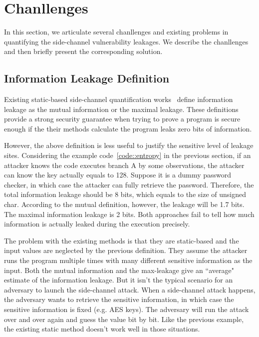 \section{Chanllenges}

In this section, we articulate several chanllenges and existing problems
in quantifying the side-channel vulnerability leakages. We describe the
chanllenges and then briefly present the corresponding solution.

\subsection{Information Leakage Definition}
Existing static-based side-channel quantification works~\cite{182946} define information leakage
as the mutual information or the maximal leakage. These definitions provide a strong security guarantee
when trying to prove a program is secure enough if the their methods calculate the program 
leaks zero bits of information.

However, the above definition is less useful to justify the sensitive level of leakage sites. 
Considering the example code~\ref{code::entropy} in the previous section, if an attacker knows the
code executes branch A by some observations, the attacker can know the key actually equals to 128. 
Suppose it is a dummy password checker, in which case the attacker can fully retrieve the password.
Therefore, the total information leakage should be 8 bits, which equals to the size
of unsigned char. 
According to the mutual definition, however, the leakage will be 1.7 bits. The maximal information
leakage is 2 bits. Both approaches fail to tell how much information is actually leaked
during the execution precisely.

The problem with the existing methods is that they are static-based and the 
input values are neglected by the previous definition. 
They assume the attacker runs the program multiple times with many different sensitive 
information as the input. Both the mutual information and the max-leakage give an ``average" 
estimate of the information leakage. But it isn't the typical scenario for an adversary to 
launch the side-channel attack. When a side-channel attack happens, the adversary wants 
to retrieve the sensitive information, in which case the sensitive information is fixed (e.g. AES keys). 
The adversary will run the attack over and over again and guess the value bit by bit. Like the 
previous example, the existing static method doesn’t work well in those situations.

